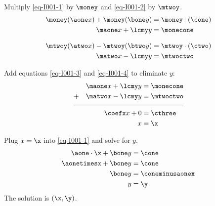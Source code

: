\begin{solution}
Multiply \eqref{eq-I001-1} by $\money$ and \eqref{eq-I001-2} by $\mtwoy$.
\begin{align}
\money(\aone x) + \money(\bone y) &=\money\cdot(\cone) \nonumber \\
\maone x + \lcmy y &= \monecone \label{eq-I001-3}
\end{align}

\begin{align}
\mtwoy(\atwo x) - \mtwoy(\btwo y) &=\mtwoy\cdot(\ctwo) \nonumber \\
\matwo x - \lcmy y &= \mtwoctwo \label{eq-I001-4}
\end{align}

Add equations \eqref{eq-I001-3} and \eqref{eq-I001-4} to eliminate $y$: 
\begin{align}
&& \maone x + \lcmy y &= \monecone \nonumber \\
+&& \matwo x - \lcmy y &= \mtwoctwo  \nonumber\\[-0.5em]
\cline{1-4}
&& \coefx x+0 &=\cthree \nonumber\\
&& x&=\x\nonumber
\end{align}



Plug $x=\x$ into \eqref{eq-I001-1} and solve for $y$.
\begin{align*}
\aone\cdot \x+ \bone y &=\cone \\
\aonetimesx+\bone y&= \cone\\
\bone y&= \coneminusaonex \\
y&=\y
\end{align*}
The solution is $(\x,\y)$. 

\end{solution}
